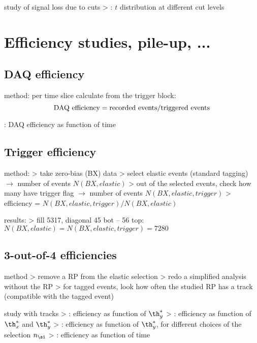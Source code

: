 \> study of signal loss due to cuts
\>> : $t$ distribution at different cut levels

\section{Efficiency studies, pile-up, ...}

\subsection{DAQ efficiency}

\> method: per time slice calculate from the trigger block:
$$\hbox{DAQ efficiency} = \hbox{recorded events} / \hbox{triggered events}$$

\> : DAQ efficiency as function of time

\subsection{Trigger efficiency}

\> method:
\>> take zero-bias (BX) data
\>> select elastic events (standard tagging) $\rightarrow$ number of events $N(BX,elastic)$
\>> out of the selected events, check how many have trigger flag $\rightarrow$ number of events $N(BX,elastic,trigger)$
\>> efficiency = $N(BX,elastic,trigger) / N(BX,elastic)$

\> results:
\>> fill 5317, diagonal 45 bot -- 56 top: $N(BX,elastic) = N(BX,elastic,trigger) = 7280$

\subsection{3-out-of-4 efficiencies}

\> method
\>> remove a RP from the elastic selection
\>> redo a simplified analysis without the RP
\>> for tagged events, look how often the studied RP has a track (compatible with the tagged event)

\> study with tracks
\>> : efficiency as function of $\th_y^*$
\>> : efficiency as function of $\th_x^*$ and $\th_y^*$
\>> : efficiency as function of $\th_y^*$, for different choices of the selection $n_\si$
\>> : efficiency as function of time

